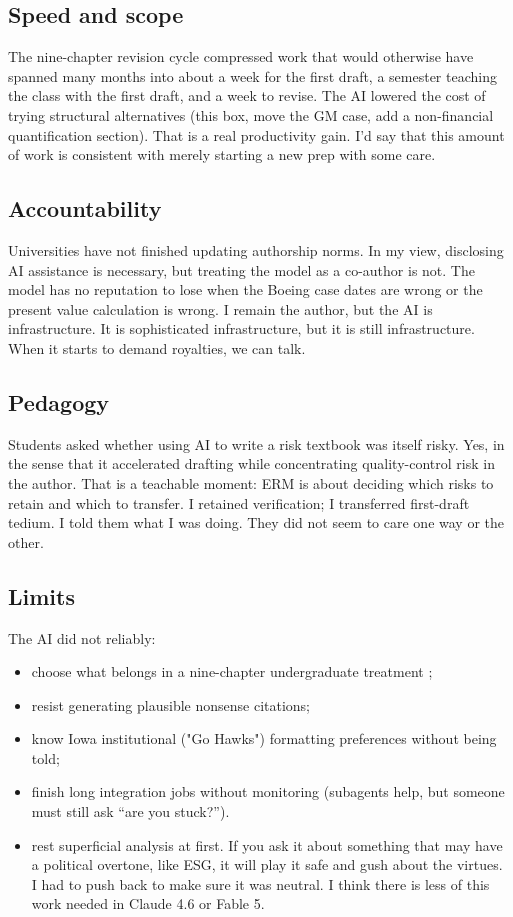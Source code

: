 \documentclass[11pt,letterpaper]{article}
\begin{document}
\subsection{Speed and scope}

The nine-chapter revision cycle compressed work that would otherwise have spanned many months into about a week for the first draft, a semester teaching the class with the first draft, and a week to revise. The AI lowered the cost of trying structural alternatives (this box, move the GM case, add a non-financial quantification section). That is a real productivity gain. I'd say that this amount of work is consistent with merely starting a new prep with some care.

\subsection{Accountability}

Universities have not finished updating authorship norms. In my view, disclosing AI assistance is necessary, but treating the model as a co-author is not. The model has no reputation to lose when the Boeing case dates are wrong or the present value calculation is wrong. I remain the author, but the AI is infrastructure. It is sophisticated infrastructure, but it is still infrastructure. When it starts to demand royalties, we can talk.

\subsection{Pedagogy}

Students asked whether using AI to write a risk textbook was itself risky. Yes, in the sense that it accelerated drafting while concentrating quality-control risk in the author. That is a teachable moment: ERM is about deciding which risks to retain and which to transfer. I retained verification; I transferred first-draft tedium. I told them what I was doing. They did not seem to care one way or the other.

\subsection{Limits}

The AI did not reliably:
\begin{itemize}[leftmargin=*, nosep]
  \item choose what belongs in a nine-chapter undergraduate treatment ;
  \item resist generating plausible nonsense citations;
  \item know Iowa institutional ("Go Hawks") formatting preferences without being told;
  \item finish long integration jobs without monitoring (subagents help, but someone must still ask ``are you stuck?'').
  \item rest superficial analysis at first. If you ask it about something that may have a political overtone, like ESG, it will play it safe and gush about the virtues. I had to push back to make sure it was neutral. I think there is less of this work needed in Claude 4.6 or Fable 5.
\end{itemize}
\end{document}
